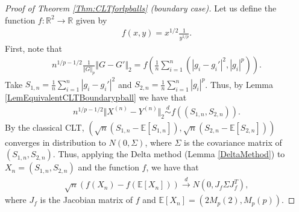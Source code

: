 \documentclass[10pt,a4paper]{amsart}
\def\E{\mathbb{E}}
\def\R{\mathbb{R}}
\begin{document}
\begin{proof}[Proof of Theorem \ref{Thm:CLTforlpballs} (boundary case)]
Let us define the function $f: \R^2 \to \R$ given by
\begin{align*}
f(x,y) =  x^{1/2} \frac{1}{y^{1/p}}.
\end{align*} 
First, note that
\begin{align*}
n^{1/p - 1/2} \frac{1}{\Vert G \Vert _p} \Vert G - G' \Vert _2 = f \left( \frac{1}{n} \sum _{i=1}^n \left( \left| g_i - g_i' \right|^2 , |g_i|^p \right)  \right).
\end{align*}
Take $S_{1,n} = \frac{1}{n} \sum _{i=1}^n  \left| g_i - g_i' \right|^2$ and $S_{2,n} = \frac{1}{n} \sum _{i=1}^n  \left| g_i  \right|^p$. Thus, by Lemma \ref{LemEquivalentCLTBoundarypball} we have that 
\begin{align*}
n^{1/p - 1/2} \Vert X^{(n)} - Y^{(n)} \Vert _2 \overset{d}{\sim} f\left( (S_{1,n} , S_{2,n}) \right).
\end{align*}
By the classical CLT, $\left( \sqrt{n} ( S_{1,n} - \E [S_{1,n}]), \sqrt{n} ( S_{2,n} - \E [S_{2,n}]) \right)$ converges in distribution to $N(0, \Sigma )$, where $\Sigma$ is the covariance matrix of $(S_{1,n},S_{2,n})$. Thus, applying the Delta method (Lemma \ref{DeltaMethod}) to $X_n = (S_{1,n} , S_{2,n})$ and the function $f$, we have that 
\begin{align*}
\sqrt{n} \left( f(X_n) - f\left( \E [X_n] \right) \right) \overset{d}{\to} N \left(0, J_f \Sigma J_f^T \right),
\end{align*}
where $J_f$ is the Jacobian matrix of $f$ and $\E[X_n] = (2M_p(2) , M_p(p))$.


\end{proof}
\end{document}

